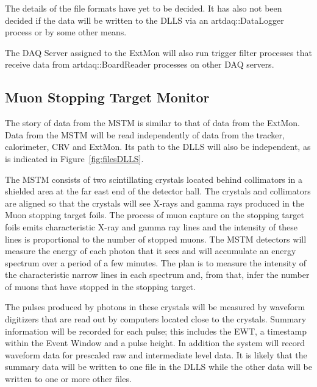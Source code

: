 The details of the file formats have yet to be decided.
It has also not been decided if the data will be written to the DLLS
via an {\code artdaq::DataLogger} process
or by some other means.

\begin{sloppypar}
The DAQ Server assigned to the ExtMon will also run trigger filter processes that receive
data from {\code artdaq::BoardReader} processes on other DAQ servers.
\end{sloppypar}




\subsection{Muon Stopping Target Monitor}
\label{ssec:MSTM}

The story of data from the MSTM is similar to that of data from the ExtMon.
Data from the MSTM  will be read independently of data
from the tracker, calorimeter, CRV and ExtMon.
Its path to the DLLS will also be independent, as is indicated in Figure~\ref{fig:filesDLLS}.

The MSTM consists of two scintillating crystals located behind collimators in a shielded area
at the far east end of the detector hall.
The crystals and collimators are aligned so that the crystals will see X-rays and gamma rays
produced in the Muon stopping target foils.
The process of muon capture on the stopping target foils emits characteristic X-ray and gamma ray
lines and the intensity of these lines is proportional to the number of stopped muons.
The MSTM detectors will measure the energy of each photon that it sees
and will accumulate an energy spectrum over a period of a few minutes.
The plan is to measure the intensity of the characteristic narrow lines in each spectrum and,
from that, infer the number of muons that have stopped in the stopping target.

The pulses produced by photons in these crystals will be measured by waveform digitizers that are read out
by computers located close to the crystals.
Summary information will be recorded for each pulse; this includes the EWT,
a timestamp within the Event Window and a pulse height.
In addition the system will record waveform data for prescaled raw and intermediate level data.
It is likely that the summary data will be written to one file in the DLLS
while the other data will be written to one or more other files.


